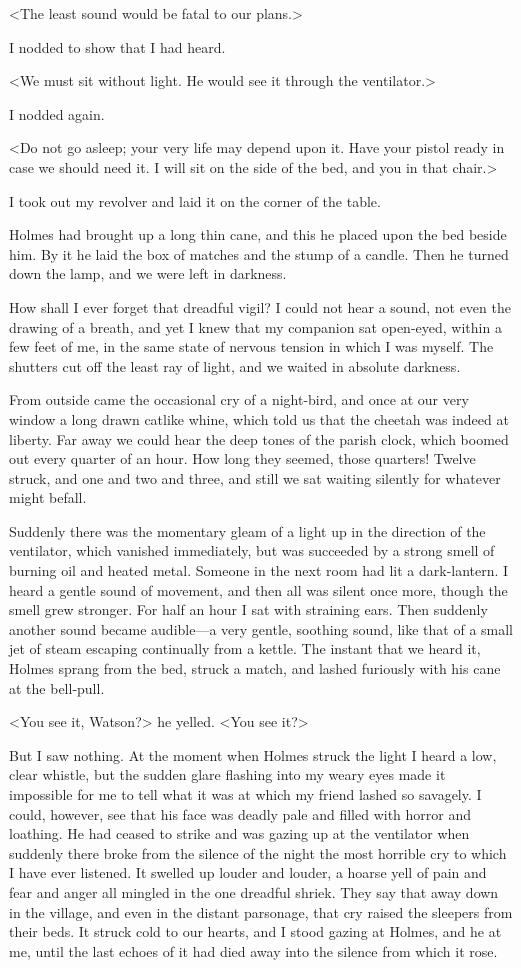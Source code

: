 <The least sound would be fatal to our plans.>

I nodded to show that I had heard.

<We must sit without light. He would see it through the ventilator.>

I nodded again.

<Do not go asleep; your very life may depend upon it. Have your pistol ready in case we should need it. I will sit on the side of the bed, and you in that chair.>

I took out my revolver and laid it on the corner of the table.

Holmes had brought up a long thin cane, and this he placed upon the bed beside him. By it he laid the box of matches and the stump of a candle. Then he turned down the lamp, and we were left in darkness.

How shall I ever forget that dreadful vigil? I could not hear a sound, not even the drawing of a breath, and yet I knew that my companion sat open-eyed, within a few feet of me, in the same state of nervous tension in which I was myself. The shutters cut off the least ray of light, and we waited in absolute darkness.

From outside came the occasional cry of a night-bird, and once at our very window a long drawn catlike whine, which told us that the cheetah was indeed at liberty. Far away we could hear the deep tones of the parish clock, which boomed out every quarter of an hour. How long they seemed, those quarters! Twelve struck, and one and two and three, and still we sat waiting silently for whatever might befall.

Suddenly there was the momentary gleam of a light up in the direction of the ventilator, which vanished immediately, but was succeeded by a strong smell of burning oil and heated metal. Someone in the next room had lit a dark-lantern. I heard a gentle sound of movement, and then all was silent once more, though the smell grew stronger. For half an hour I sat with straining ears. Then suddenly another sound became audible—a very gentle, soothing sound, like that of a small jet of steam escaping continually from a kettle. The instant that we heard it, Holmes sprang from the bed, struck a match, and lashed furiously with his cane at the bell-pull.

<You see it, Watson?> he yelled. <You see it?>

But I saw nothing. At the moment when Holmes struck the light I heard a low, clear whistle, but the sudden glare flashing into my weary eyes made it impossible for me to tell what it was at which my friend lashed so savagely. I could, however, see that his face was deadly pale and filled with horror and loathing. He had ceased to strike and was gazing up at the ventilator when suddenly there broke from the silence of the night the most horrible cry to which I have ever listened. It swelled up louder and louder, a hoarse yell of pain and fear and anger all mingled in the one dreadful shriek. They say that away down in the village, and even in the distant parsonage, that cry raised the sleepers from their beds. It struck cold to our hearts, and I stood gazing at Holmes, and he at me, until the last echoes of it had died away into the silence from which it rose.

